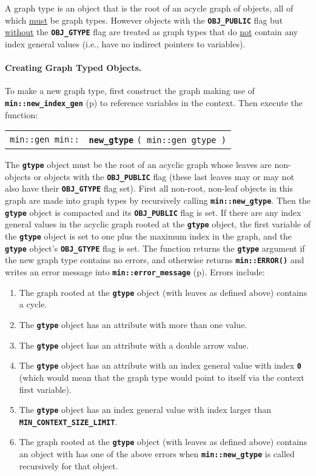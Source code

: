 \documentclass[12pt]{article}
\makeatletter
\newcommand{\subsubsubsection}[1]{\paragraph[#1]{#1.}}
\newcommand{\TT}[1]{{\tt \bfseries #1}}
\newcommand{\ttindex}[1]{\index{#1@{\tt #1}}}
\newcommand{\pagref}[1]{p\pageref{#1}}
\newcommand{\EOL}{\penalty \exhyphenpenalty}
\newenvironment{indpar}[1][0.3in]%
	{\begin{list}{}%
		     {\setlength{\itemsep}{0in}%
		      \setlength{\topsep}{0in}%
		      \setlength{\parsep}{1ex}%
		      \setlength{\labelwidth}{#1}%
		      \setlength{\leftmargin}{#1}%
		      \addtolength{\leftmargin}{\labelsep}}%
	 \item}%
	{\end{list}}
\newcommand{\LABEL}[1]{\label{#1}}
\newcommand{\MINKEY}[1]%
	   {\TT{#1}\ttindex{min::#1}\ttindex{#1}}
\makeatother
\begin{document}
A graph type is an object that is the root of an acycle graph
of objects, all of which \underline{must} be graph types.  However objects with
the \TT{OBJ\_\EOL PUBLIC} flag but \underline{without} the
\TT{OBJ\_\EOL GTYPE} flag are treated as graph types that do
\underline{not} contain any index general values (i.e., have no
indirect pointers to variables).

\subsubsubsection{Creating Graph Typed Objects}
\label{CREATING-GRAPH-TYPED-OBJECTS}

To make a new graph type, first construct the graph making use of
\TT{min::\EOL new\_\EOL index\_\EOL gen} (\pagref{MIN::NEW_INDEX_GEN})
to reference variables in the context.  Then execute the function:

\begin{indpar}[1em]\begin{tabular}{r@{}l}
\verb|min::gen min::| & \MINKEY{new\_gtype} \verb|( min::gen gtype )|
\LABEL{MIN::NEW_GTYPE} \\
\end{tabular}\end{indpar}

The \TT{gtype} object must be the root of an acyclic graph whose
leaves are non-objects or objects with the \TT{OBJ\_\EOL PUBLIC}
flag (these last leaves may or may not also have their
\TT{OBJ\_\EOL GTYPE} flag set).
First all non-root, non-leaf objects in this graph are
made into graph types by recursively calling \TT{min::\EOL new\_\EOL gtype}.
Then the \TT{gtype} object is compacted and its \TT{OBJ\_\EOL PUBLIC}
flag is set.  If there are any
index general values in the acyclic graph rooted at the \TT{gtype} object,
the first variable of the \TT{gtype} object is set to one plus the
maximum index in the graph, and the \TT{gtype} object's
\TT{OBJ\_\EOL GTYPE} flag is set.
The function returns the \TT{gtype} argument if the new graph type
contains no errors,
and otherwise returns \TT{min::\EOL ERROR()} and writes an
error message into \TT{min::\EOL error\_\EOL message}
(\pagref{ERROR_MESSAGE}).
Errors include:
\begin{indpar}\begin{enumerate}
\item The graph rooted at the \TT{gtype} object (with leaves as defined
above) contains a cycle.
\item The \TT{gtype} object has an attribute with more than one value.
\item The \TT{gtype} object has an attribute with a double arrow value.
\item The \TT{gtype} object has an attribute with
an index general value with index \TT{0}
(which would mean that the graph type would point to itself via the
context first variable).
\item The \TT{gtype} object has an index general value with index larger
than \TT{MIN\_\EOL CONTEXT\_\EOL SIZE\_\EOL LIMIT}.
\item The graph rooted at the \TT{gtype} object (with leaves as defined
above) contains an object with has one of the above errors when
\TT{min::\EOL new\_\EOL gtype} is called recursively for that object.
\end{enumerate}\end{indpar}
\end{document}
